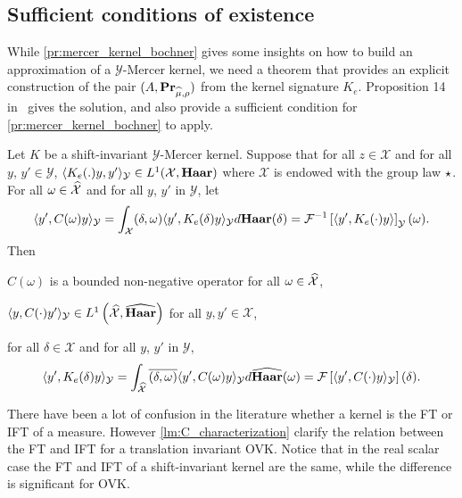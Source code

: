 \subsection{Sufficient conditions of existence}
\label{subsec:sufficient_conditions}
While \cref{pr:mercer_kernel_bochner} gives some insights on how to build an approximation of a $\mathcal{Y}$-Mercer kernel, we need a theorem that provides an explicit construction of the pair $(A, {\mathbf{{Pr}}}_{\widehat{\mu},\rho})$ from the kernel signature $K_e$. Proposition 14 in~\citet{Carmeli2010} gives the solution, and also provide a sufficient condition for \cref{pr:mercer_kernel_bochner} to apply.
\begin{proposition}
\label{pr:inverse_ovk_Fourier_decomposition}
Let $K$ be a shift-invariant $\mathcal{Y}$-Mercer kernel. %
Suppose that for all $z \in \mathcal{X}$ and for all $y$, $y' \in\mathcal{Y}$, $\langle K_e(.)y,y'\rangle_{\mathcal{Y}}\in L^1(\mathcal{X},\mathbf{Haar})$ where $\mathcal{X}$ is endowed with the group law $\star$. For all $\omega \in \widehat{\mathcal{X}}$ and for all $y$, $y'$ in $\mathcal{Y}$, let
\begin{dmath}\label{eq:CK0}
\inner{y',C(\omega)y}_{\mathcal{Y}}= \int_{\mathcal{X}} \pairing{\delta, \omega}\inner{y', K_e(\delta)y}_{\mathcal{Y}}d\Haar(\delta) = \IFT{\inner{y', K_e(\cdot)y}}_{\mathcal{Y}}(\omega).
\end{dmath}
Then
\begin{propenum}
\item $C(\omega)$ is a bounded non-negative operator for all $\omega \in \widehat{\mathcal{X}}$,
\item $\langle y, C(\cdot)y'\rangle_{\mathcal{Y}}\in L^1\left(\widehat{\mathcal{X}},\widehat{\mathbf{Haar}}\right)$ for all $y,y'\in\mathcal{X}$,
\item for all $\delta\in\mathcal{X}$ and for all $y$, $y'$ in $\mathcal{Y}$,
\begin{dmath*}
\inner{y', K_e(\delta)y}_{\mathcal{Y}}= \int_{\dual{\mathcal{X}}}\conj{\pairing{\delta,\omega}}\inner{y', C(\omega)y}_{\mathcal{Y}}d\dual{\Haar}(\omega)
=\FT{\inner{y', C(\cdot)y}_{\mathcal{Y}}}(\delta).
\end{dmath*}
\end{propenum}
\end{proposition}
There have been a lot of confusion in the literature whether a kernel is the \acl{FT} or \acl{IFT} of a measure. However \cref{lm:C_characterization} clarify the relation between the \acl{FT} and \acl{IFT} for a translation invariant \acl{OVK}. Notice that in the real scalar case the \acl{FT} and \acl{IFT} of a shift-invariant kernel are the same, while the difference is significant for \acs{OVK}.
